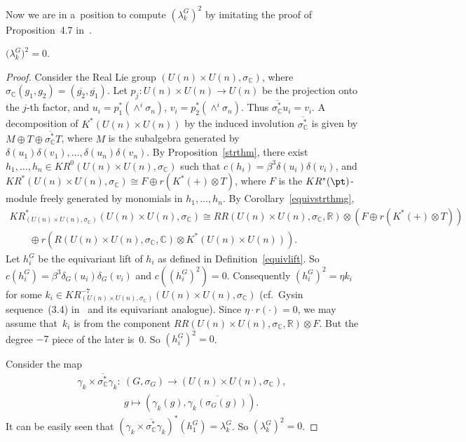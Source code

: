 Now we are in a~position to compute $(\lambda_k^G)^2$ by imitating the proof of Proposition~4.7 in~\cite{Se}.
\begin{Proposition}
\label{cplxsquare}
$\big(\lambda_k^G\big)^2=0$.
\end{Proposition}
\begin{proof}
Consider the Real Lie group $(U(n)\times U(n),
\sigma_\mathbb{C})$, where $\sigma_\mathbb{C}
(g_1, g_2)=(\overline{g_2}, \overline{g_1})$.
Let $p_j: U(n)\times U(n)\to U(n)$ be the projection onto the $j$-th factor, and $u_i=p_1^*(\wedge^i
\sigma_n)$, $v_i=p_2^*(\wedge^i\sigma_n)$.
Thus $\overline{\sigma_\mathbb{C}^*}u_i=v_i$.
A decomposition of $K^*(U(n)\times U(n))$ by the induced involution $\overline{\sigma_\mathbb{C}^*}$ is given by $M\oplus T\oplus \overline{\sigma_\mathbb{C}^*}T$, where $M$ is the subalgebra generated by $\delta(u_1)\delta(v_1), \dots, \delta(u_n)\delta(v_n)$.
By Proposition~\ref{strthm}, there exist $h_1, \dots, h_n\in KR^0(U(n)\times U(n),
\sigma_\mathbb{C})$ such that $c(h_i)=\beta^3\delta(u_i)\delta(v_i)$, and $KR^*(U(n)\times U(n),
\sigma_\mathbb{C})\cong F\oplus r(K^*(+)\otimes T)$, where $F$ is the $KR^*(\pt)$-module freely generated by monomials in $h_1,
\dots, h_n$.
By Corollary~\ref{equivstrthmg},
\begin{gather*}
KR^*_{(U(n)\times U(n),
\sigma_\mathbb{C})}(U(n)\times U(n),
\sigma_\mathbb{C})
\cong
RR(U(n)\times U(n),
\sigma_\mathbb{C}, \mathbb{R})\otimes(F\oplus r(K^*(+)\otimes T))
\\
\qquad{}
\oplus
r(R(U(n)\times U(n),
\sigma_\mathbb{C}, \mathbb{C})\otimes K^*(U(n)\times U(n))).
\end{gather*}
Let $h_i^G$ be the equivariant lift of $h_i$ as def\/ined in Def\/inition~\ref{equivlift}.
So $c(h_i^G)=\beta^3\delta_G(u_i)\delta_G(v_i)$ and $c((h_i^G)^2)=0$.
Consequently $(h_i^G)^2=\eta k_i$ for some $k_i\in KR^{-7}_{(U(n)\times U(n),
\sigma_\mathbb{C})}(U(n)\times U(n),
\sigma_\mathbb{C})$ (cf.\ Gysin sequence~(3.4) in~\cite{At3} and its equivariant analogue).
Since $\eta\cdot r(\cdot)=0$, we may assume that~$k_i$ is from the component $RR(U(n)\times U(n),
\sigma_\mathbb{C}, \mathbb{R})\otimes F$.
But the degree $-7$ piece of the later is~0.
So $(h_i^G)^2=0$.

Consider the map
\begin{gather*}
\gamma_k\times \overline{\sigma_\mathbb{C}^*}\gamma_k: \ (G,\sigma_G)  \to (U(n)\times U(n), \sigma_\mathbb{C}),
\\
\phantom{\gamma_k\times \overline{\sigma_\mathbb{C}^*}\gamma_k: {}} \
g  \mapsto  (\gamma_k(g), \overline{\gamma_k(\sigma_G(g))}).
\end{gather*}
It can be easily seen that $(\gamma_k\times\overline{\sigma_\mathbb{C}^*}\gamma_k)^*(h_1^G)=\lambda_k^G$.
So $(\lambda_k^G)^2=0$.
\end{proof}

